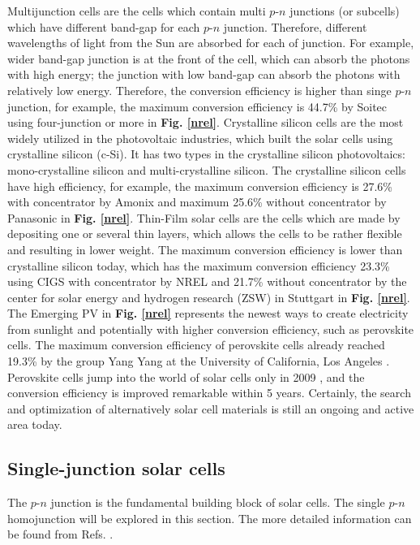 \documentclass[a4paper, 12pt, titlepage,oneside,drop]{kthesis}
\begin{document}
Multijunction cells are the cells which contain multi $p$-$n$ junctions (or subcells) which have different band-gap for each $p$-$n$ junction.
Therefore, different wavelengths of light from the Sun are absorbed for each of junction. For example, wider band-gap junction is at the front of the cell, which can absorb the photons with high energy; the junction with 
low band-gap can absorb the photons with relatively low energy. Therefore, the conversion efficiency is higher than singe $p$-$n$ junction, for example, the maximum conversion efficiency is 44.7\% by Soitec \cite{dimroth2014wafer} using 
four-junction or more in \textbf{Fig. \ref{nrel}}. Crystalline silicon cells are the most widely utilized in the photovoltaic industries, which built the solar cells using crystalline silicon (c-Si). It has two types in
the crystalline silicon photovoltaics: mono-crystalline silicon and multi-crystalline silicon. The crystalline silicon cells have high efficiency, for example, the maximum conversion efficiency is 27.6\% with concentrator 
by Amonix \cite{jones2009new} and maximum 25.6\% without concentrator by Panasonic \cite{panasonic} in \textbf{Fig. \ref{nrel}}. Thin-Film solar cells are the cells which are made by depositing one or several thin layers, which allows the cells to be rather 
flexible and resulting in lower weight. The maximum conversion efficiency is lower than crystalline silicon today, which has the maximum conversion efficiency 23.3\% using CIGS with concentrator by NREL \cite{ward2014cu} and 
21.7\% without concentrator by the center for solar energy and hydrogen research (ZSW) in Stuttgart \cite{zsw} in \textbf{Fig. \ref{nrel}}. The Emerging PV in \textbf{Fig. \ref{nrel}} represents the newest ways to create electricity from
sunlight and potentially with higher conversion efficiency, such as perovskite cells. The maximum conversion efficiency of perovskite cells already reached 19.3\% by the group Yang Yang at the University of California, Los Angeles \cite{zhou2014interface}. 
Perovskite cells jump into the world of solar cells only in 2009 \cite{green2014emergence, mcgehee2014perovskite}, and the conversion efficiency is improved remarkable within 5 years. Certainly, the search and optimization 
of alternatively solar cell materials is still an ongoing and active area today.


\subsection{Single-junction solar cells}
The $p$-$n$ junction is the fundamental building block of solar cells. The single $p$-$n$ homojunction will be explored in this section. The more detailed information can be found from Refs. \cite{bok1,sproul2003understanding, neamen2003semiconductor}.
\end{document}

